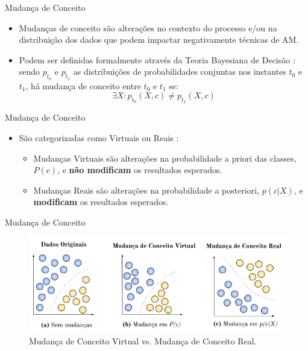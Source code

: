 \documentclass[10pt]{beamer}
\begin{document}
\begin{frame}{Mudança de Conceito}
    \begin{itemize}
        \item<1 -> \alert{Mudanças de conceito} são alterações no contexto do processo e/ou na distribuição dos dados que podem impactar negativamente técnicas de AM.
        \item<1 -> Podem ser definidas formalmente através da Teoria Bayesiana de Decisão \cite{Duda:2000:PC:954544}: sendo $p_{t_0}$ e $p_{t_1}$ as distribuições de probabilidades conjuntas nos instantes $t_0$ e $t_1$, há mudança de conceito entre $t_0$ e $t_1$ se:
        \begin{equation} \label{eq:3}
            {\exists}X : p_{t_0}(X, c) \ne p_{t_1}(X, c)
        \end{equation}
    \end{itemize}
\end{frame}

\begin{frame}{Mudança de Conceito}
    \begin{itemize}
        \item<1 -> São categorizadas como \alert{Virtuais} ou \alert{Reais} \cite{Gama:2014:SCD:2597757.2523813}:
        \begin{itemize}
        \item<1 -> \alert{Mudanças Virtuais} são alterações na probabilidade a priori das classes, $P(c)$, e \alert{\textbf{não modificam} os resultados esperados}.
        \item<1 -> \alert{Mudanças Reais} são alterações na probabilidade a posteriori, $p(c|X)$, e \alert{\textbf{modificam} os resultados esperados}.
        \end{itemize}
    \end{itemize}
\end{frame}

\begin{frame}{Mudança de Conceito}
\begin{figure}[H]
    \begin{center}
        \includegraphics[scale=0.55]{imagens/concept_drift.png}
        \caption{Mudança de Conceito Virtual vs. Mudança de Conceito Real.}
        \label{fig:real_and_virtual_concept_drift}
    \end{center}
\end{figure}
\end{frame}
\end{document}
